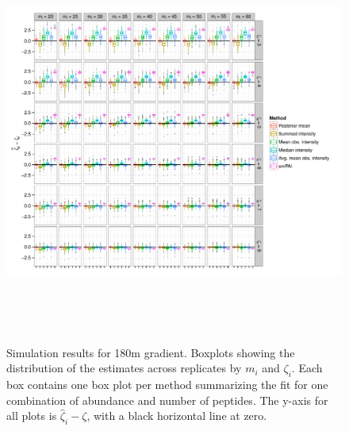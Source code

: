 \begin{figure}
\centering
\includegraphics[height=5.25in, page=2]{figures/proteomics/figures_boxplot_sim}
\caption{Simulation results for 180m gradient.
Boxplots showing the distribution of the estimates across replicates by $m_i$ and $\zeta_i$.
Each box contains one box plot per method summarizing the fit for one combination of abundance and number of peptides.
The y-axis for all plots is $\hat{\zeta}_i - \zeta$, with a black horizontal line at zero.}
\end{figure}


